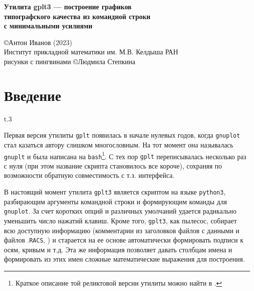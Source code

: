 \documentclass[12pt]{article}
\def\gplt{{\tt gplt}}
\def\gnuplot{{\tt gnuplot}}
\def\python{{\tt python3}}
\def\RACS{{\tt RACS}}
\begin{document}
\begin{center}
 { \Large\bf
Утилита gplt3 --- построение графиков\\ типографского качества из командной строки\\ с минимальными усилиями\\[5mm]
}

\large
\copyright Антон Иванов (2023)\\[2mm]

\normalsize
Институт прикладной математики им. М.В. Келдыша РАН\\[2mm]

\small рисунки с пингвинами \copyright Людмила Степкина 
\vfill


\vfill
\end{center}


\tableofcontents

\newpage
\section{Введение}
\begin{wrapfigure}[5]{t}{.3\textwidth}
  \vphantom{.}
  \vspace{-1.5cm}

\end{wrapfigure}

Первая версия утилиты \gplt{} появилась в начале нулевых годов, когда \gnuplot{} стал казаться автору слишком многословным.
На тот момент она называлась \verb'gnuplt' и была написана на \verb'bash'\footnote{Краткое описание той реликтовой версии утилиты можно найти в \cite{aiv:racs2007}.}.
С тех пор \gplt{} переписывалась несколько раз с нуля (при этом название скрипта становилось все короче),
сохраняя по возможности обратную совместимость с т.з. интерфейса.  

\def\gplt{{\tt gplt3}}

В настоящий момент утилита \gplt{} является скриптом на языке \python, разбирающим аргументы командной строки и формирующим команды для \gnuplot.
За счет коротких опций и различных умолчаний удается радикально уменьшить число нажатий клавиш. Кроме того, \gplt{}, как пылесос, собирает всю доступную информацию
(комментарии из заголовков файлов с данными и файлов .\RACS, \cite{aiwlib:SR:PP2018})
и старается на ее основе автоматически формировать подписи к осям, кривым и т.д.
Эта же информация позволяет давать столбцам имена и формировать из этих имен сложные математические выражения для построения.
\end{document}
